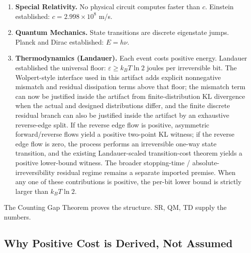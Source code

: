 \begin{enumerate}
\item[\textbf{SR.}] \textbf{Special Relativity.}
  No physical circuit computes faster than $c$.
  Einstein established: $c = 2.998 \times 10^8$ m/s.
  \cite{einstein1905electrodynamics,minkowski1908space}

\item[\textbf{QM.}] \textbf{Quantum Mechanics.}
  State transitions are discrete eigenstate jumps.
  Planck and Dirac established: $E = h\nu$.
  \cite{planck1901distribution,dirac1930principles}

\item[\textbf{TD.}] \textbf{Thermodynamics (Landauer).}
  Each event costs positive energy.
  Landauer established the universal floor: $\varepsilon \geq k_B T \ln 2$ joules per irreversible bit. The Wolpert-style interface used in this artifact adds explicit nonnegative mismatch and residual dissipation terms above that floor; the mismatch term can now be justified inside the artifact from finite-distribution KL divergence when the actual and designed distributions differ, and the finite discrete residual branch can also be justified inside the artifact by an exhaustive reverse-edge split. If the reverse edge flow is positive, asymmetric forward/reverse flows yield a positive two-point KL witness; if the reverse edge flow is zero, the process performs an irreversible one-way state transition, and the existing Landauer-scaled transition-cost theorem yields a positive lower-bound witness. The broader stopping-time / absolute-irreversibility residual regime remains a separate imported premise. When any one of these contributions is positive, the per-bit lower bound is strictly larger than $k_B T \ln 2$.
  \cite{landauer1961irreversibility,bennett1982thermodynamics,berut2012experimental,wolpert2024stochastic,manzano2024absolute,yadav2026minimal}
\end{enumerate}

\noindent The Counting Gap Theorem proves the structure. SR, QM, TD supply the numbers.

\subsection{Why Positive Cost is Derived, Not Assumed}\label{sec:positive-cost-derived}

